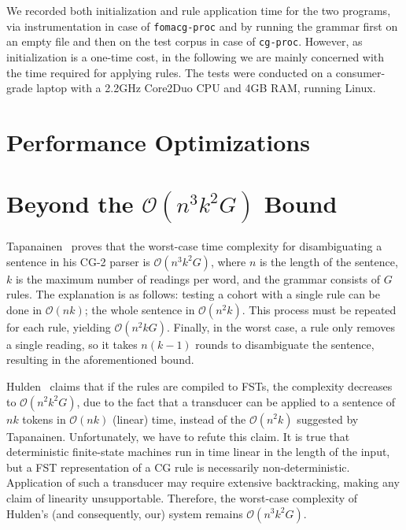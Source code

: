 \documentclass{article}
\begin{document}
We recorded both initialization and rule application time for the two programs,
via instrumentation in case of \texttt{fomacg-proc} and by running the grammar
first on an empty file and then on the test corpus in case of \texttt{cg-proc}.
However, as initialization is a one-time cost, in the following we are mainly
concerned with the time required for applying rules. The tests were conducted on
a consumer-grade laptop with a 2.2GHz Core2Duo CPU and 4GB RAM, running Linux.

\section{Performance Optimizations}
\label{sec:speed}

\section{Beyond the $\mathcal{O}(n^3k^2G)$ Bound}
\label{sec:idea}

Tapanainen~ proves that the worst-case time complexity
for disambiguating a sentence in his CG-2 parser is $\mathcal{O}(n^3k^2G)$,
where $n$ is the length of the sentence, $k$ is the maximum number of readings
per word, and the grammar consists of $G$ rules. The explanation is as follows:
testing a cohort with a single rule can be done in $\mathcal{O}(nk)$; 
the whole sentence in $\mathcal{O}(n^2k)$. This process must be repeated for
each rule, yielding $\mathcal{O}(n^2kG)$. Finally, in the worst case, a rule
only removes a single reading, so it takes $n(k - 1)$ rounds to disambiguate the
sentence, resulting in the aforementioned bound.

Hulden~ claims that if the rules are compiled to FSTs,
the complexity decreases to $\mathcal{O}(n^2k^2G)$, due to the fact that a
transducer can be applied to a sentence of $nk$ tokens in $\mathcal{O}(nk)$
(linear) time, instead of the $\mathcal{O}(n^2k)$ suggested by Tapanainen.
Unfortunately, we have to refute this claim. It is true that deterministic
finite-state machines run in time linear in the length of the input, but a FST
representation of a CG rule is necessarily non-deterministic. Application of
such a transducer may require extensive backtracking, making any claim of
linearity unsupportable. Therefore, the worst-case complexity of Hulden's (and
consequently, our) system remains $\mathcal{O}(n^3k^2G)$.
\end{document}
